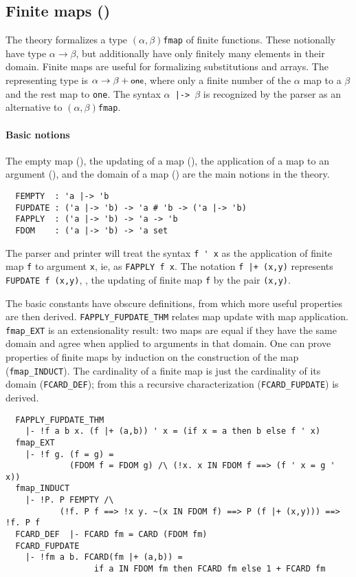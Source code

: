 \subsection{Finite maps ()}\label{finite_map}

The theory  formalizes a type
$(\alpha,\beta)$\verb+fmap+ of finite functions. These notionally have
type $\alpha\to\beta$, but additionally have only finitely many
elements in their domain. Finite maps are useful for formalizing
substitutions and arrays. The representing type is $\alpha\to\beta +
\mbox{\small{\textbf{\sf{one}}}}$, where only a finite number of the $\alpha$ map to a
$\beta$ and the rest map to \verb+one+. The syntax
$\alpha$\verb+ |-> +$\beta$ is recognized by the parser as an
alternative to $(\alpha,\beta)$\verb+fmap+.

\paragraph {Basic notions}

The empty map (), the updating of a map
(), the application of a map to an argument
(), and the domain of a map () are the
main notions in the theory.
%
{\small
\begin{verbatim}
  FEMPTY  : 'a |-> 'b
  FUPDATE : ('a |-> 'b) -> 'a # 'b -> ('a |-> 'b)
  FAPPLY  : ('a |-> 'b) -> 'a -> 'b
  FDOM    : ('a |-> 'b) -> 'a set
\end{verbatim}
}

The \HOL{} parser and printer will treat the syntax \verb+f ' x+ as
the application of finite map \verb+f+ to argument \verb+x+, ie, as
{\small\verb+FAPPLY f x+}. The notation \verb#f |+ (x,y)# represents
{\small\verb+FUPDATE f (x,y)+}, \ie, the updating of finite map
\verb+f+ by the pair \verb+(x,y)+.

The basic constants have obscure definitions, from which more useful
properties are then derived. {\small\verb+FAPPLY_FUPDATE_THM+} relates
map update with map application.  {\small\verb+fmap_EXT+} is an
extensionality result: two maps are equal if they have the same domain
and agree when applied to arguments in that domain. One can prove
properties of finite maps by induction on the construction of the map
({\small\verb+fmap_INDUCT+}).  The cardinality of a finite map is
just the cardinality of its domain ({\small\verb+FCARD_DEF+}); from
this a recursive characterization ({\small\verb+FCARD_FUPDATE+}) is
derived.
%
{\small
\begin{verbatim}
  FAPPLY_FUPDATE_THM
    |- !f a b x. (f |+ (a,b)) ' x = (if x = a then b else f ' x)
  fmap_EXT
    |- !f g. (f = g) =
             (FDOM f = FDOM g) /\ (!x. x IN FDOM f ==> (f ' x = g ' x))
  fmap_INDUCT
    |- !P. P FEMPTY /\
           (!f. P f ==> !x y. ~(x IN FDOM f) ==> P (f |+ (x,y))) ==> !f. P f
  FCARD_DEF  |- FCARD fm = CARD (FDOM fm)
  FCARD_FUPDATE
    |- !fm a b. FCARD(fm |+ (a,b)) =
                  if a IN FDOM fm then FCARD fm else 1 + FCARD fm
\end{verbatim}
}

